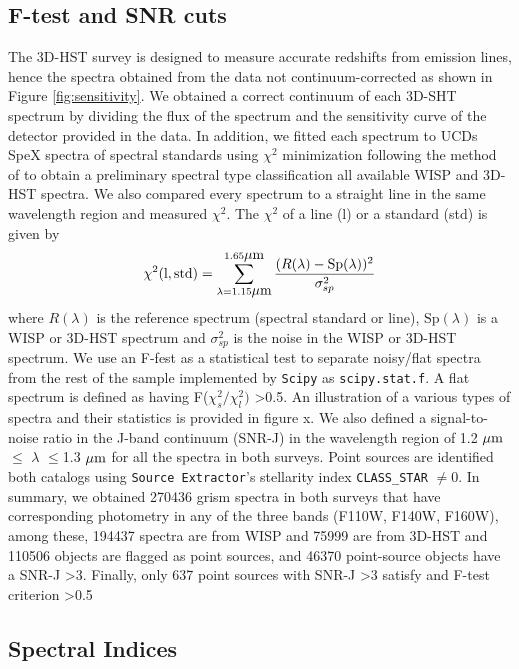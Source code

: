 \documentclass[manuscript]{aastex}
\begin{document}
\subsection{ F-test and SNR cuts}

The 3D-HST survey is designed to measure accurate redshifts from emission lines, hence the spectra obtained from the data not continuum-corrected as shown in Figure \ref{fig:sensitivity}. We obtained a correct continuum of each 3D-SHT spectrum by dividing the flux of the spectrum and the sensitivity curve of the detector provided in the data. In addition, we fitted each spectrum to UCDs SpeX spectra of spectral standards using $\chi^2$ minimization following the method of  \cite{2010ApJS..190..100K} to obtain a preliminary spectral type classification all available WISP and 3D-HST spectra. We also compared every spectrum to a straight line in the same wavelength region and measured $\chi^2$. The  $\chi^2 $ of a line (l) or a standard (std) is given by
\begin{equation}
\chi^2(\text{l}, \text{std}) = \sum _{\lambda = 1.15 \micron} ^{ 1.65 \micron} \frac{(R(\lambda)-\text{Sp} (\lambda))^2}{ \sigma_{sp} ^2 }
\end{equation} where $R(\lambda)$ is the reference spectrum (spectral standard or line), $\text{Sp}  (\lambda)$ is a WISP or 3D-HST spectrum and $\sigma_{sp} ^2 $ is the noise in the WISP or 3D-HST spectrum. We use an F-fest as a statistical test to separate noisy/flat spectra from the rest of the sample implemented by \texttt{Scipy} \citealt{scipy} as \texttt{scipy.stat.f}. A flat spectrum is defined as having F($\chi^2_s/ \chi ^2 _l)$ \textgreater  0.5. An illustration of a various types of spectra and their statistics is provided in figure x. We also defined a signal-to-noise ratio in the J-band continuum (SNR-J) in the wavelength region of 1.2 $\mbox{$\mu$m}$ $\leq$ $\lambda$ $\leq$1.3 $\mbox{$\mu$m}$ for all the spectra in both surveys. Point sources are identified both catalogs using \texttt{Source Extractor}'s stellarity index \texttt{CLASS\_STAR} $\neq$0. In summary, we obtained 270436 grism spectra in both surveys that have corresponding photometry in any of the three bands (F110W, F140W, F160W), among these, 194437 spectra are from WISP and 75999 are from 3D-HST and 110506 objects are flagged as point sources, and 46370 point-source objects have a SNR-J \textgreater3. Finally, only 637 point sources with SNR-J \textgreater3 satisfy and F-test criterion \textgreater0.5

\subsection{Spectral Indices}\label{indices}
\end{document}
